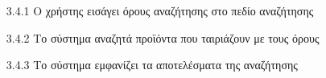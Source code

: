 \documentclass[12pt,a4paper,twoside]{book}
\begin{document}
\begin{enumerate}
        \begin{enumerate}
          \item [3.4.1 ] Ο χρήστης εισάγει όρους αναζήτησης στο πεδίο αναζήτησης
          \item [3.4.2 ] Το σύστημα αναζητά προϊόντα που ταιριάζουν με τους όρους
          \item [3.4.3 ] Το σύστημα εμφανίζει τα αποτελέσματα της αναζήτησης
        \end{enumerate}
\end{enumerate}
\end{document}
